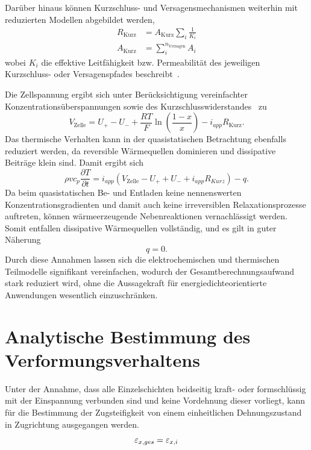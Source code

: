 Darüber hinaus können Kurzschluss- und Versagensmechanismen weiterhin mit reduzierten Modellen abgebildet werden,
\begin{align}
    R_{\text{Kurz}} &= A_{\text{Kurz}} \sum_{i} \frac{1}{K_i}\\
    A_{\text{Kurz}} &= \sum_{i}^{n_{\text{Versagen}}} A_{i}
\end{align}
wobei $K_i$ die effektive Leitfähigkeit bzw. Permeabilität des jeweiligen Kurzschluss- oder Versagenspfades beschreibt~\cite{Zhang2016}.

Die Zellspannung ergibt sich unter Berücksichtigung vereinfachter Konzentrationsüberspannungen sowie des Kurzschlusswiderstandes~\cite{Daigle2013} zu
\begin{equation}
    V_{\text{Zelle}} = U_{+} - U_{-} + \frac{RT}{F} \ln \left( \frac{1-x}{x}\right) - i_{app} R_{\text{Kurz}}.
\end{equation}
Das thermische Verhalten kann in der quasistatischen Betrachtung ebenfalls reduziert werden, da reversible Wärmequellen dominieren und dissipative Beiträge klein sind. Damit ergibt sich
\begin{equation}
    \rho v c_p \frac{\partial T}{\partial t} = i_{app}\left(V_{\text{Zelle}} - U_{+} + U_{-} + i_{app} R_{Kurz} \right) -q.
\end{equation}
Da beim quasistatischen Be- und Entladen keine nennenswerten Konzentrationsgradienten und damit auch keine irreversiblen Relaxationsprozesse auftreten, können wärmeerzeugende Nebenreaktionen vernachlässigt werden. Somit entfallen dissipative Wärmequellen vollständig, und es gilt in guter Näherung
\begin{equation}
    q = 0.
\end{equation}
Durch diese Annahmen lassen sich die elektrochemischen und thermischen Teilmodelle signifikant vereinfachen, wodurch der Gesamtberechnungsaufwand stark reduziert wird, ohne die Aussagekraft für energiedichteorientierte Anwendungen wesentlich einzuschränken.


\section{\label{sec:improve_mech}Analytische Bestimmung des Verformungsverhaltens}
Unter der Annahme, dass alle Einzelschichten beidseitig kraft- oder formschlüssig mit der Einspannung verbunden sind und keine Vordehnung dieser vorliegt, kann für die Bestimmung der Zugsteifigkeit von einem einheitlichen Dehnungszustand in Zugrichtung ausgegangen werden.
\begin{equation}
    \varepsilon_{x,ges} = \varepsilon_{x,i}\\
\end{equation}


